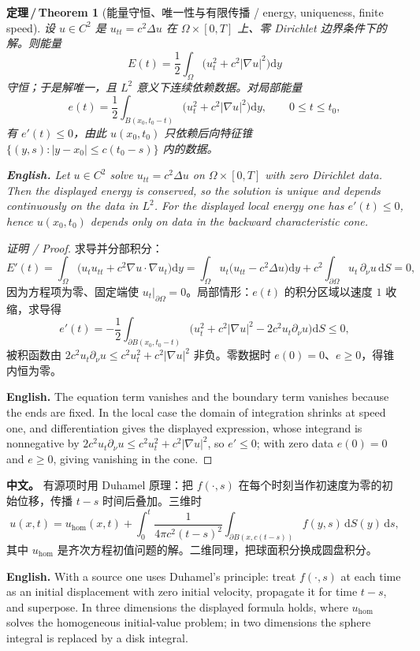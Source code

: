 \documentclass[UTF8,11pt,a4paper]{ctexart}
\newcommand{\APS}[2]{\par\noindent\textbf{中文。} #1\par\noindent\textbf{English.} #2\par\smallskip}
\newcommand{\EN}[1]{\par\noindent \textbf{English.} #1\par}
\newtheorem{theorem}[definition]{定理\,/\,Theorem}
\newcommand{\dd}{\mathrm{d}}
\begin{document}
\begin{theorem}[能量守恒、唯一性与有限传播 / energy, uniqueness, finite speed]\label{thm:waveenergy}
设 $u\in C^2$ 是 $u_{tt}=c^2\Delta u$ 在 $\Omega\times[0,T]$ 上、零 Dirichlet 边界条件下的解。则能量
\[
E(t)=\frac12\int_\Omega\bigl(u_t^2+c^2|\nabla u|^2\bigr)\dd y
\]
守恒；于是解唯一，且 $L^2$ 意义下连续依赖数据。对局部能量
\[
e(t)=\frac12\int_{B(x_0,t_0-t)}\bigl(u_t^2+c^2|\nabla u|^2\bigr)\dd y,\qquad 0\le t\le t_0,
\]
有 $e'(t)\le0$，由此 $u(x_0,t_0)$ 只依赖后向特征锥 $\{(y,s):|y-x_0|\le c(t_0-s)\}$ 内的数据。
\EN{Let $u\in C^2$ solve $u_{tt}=c^2\Delta u$ on $\Omega\times[0,T]$ with zero Dirichlet data. Then the displayed energy is conserved, so the solution is unique and depends continuously on the data in $L^2$. For the displayed local energy one has $e'(t)\le0$, hence $u(x_0,t_0)$ depends only on data in the backward characteristic cone.}
\end{theorem}

\begin{proof}[证明 / Proof]
求导并分部积分：
\[
E'(t)=\int_\Omega\bigl(u_tu_{tt}+c^2\nabla u\cdot\nabla u_t\bigr)\dd y
=\int_\Omega u_t\bigl(u_{tt}-c^2\Delta u\bigr)\dd y+c^2\int_{\partial\Omega}u_t\,\partial_\nu u\,\dd S=0,
\]
因为方程项为零、固定端使 $u_t|_{\partial\Omega}=0$。局部情形：$e(t)$ 的积分区域以速度 $1$ 收缩，求导得
\[
e'(t)=-\frac12\int_{\partial B(x_0,t_0-t)}\bigl(u_t^2+c^2|\nabla u|^2-2c^2u_t\partial_\nu u\bigr)\dd S\le0,
\]
被积函数由 $2c^2u_t\partial_\nu u\le c^2u_t^2+c^2|\nabla u|^2$ 非负。零数据时 $e(0)=0$、$e\ge0$，得锥内恒为零。\EN{The equation term vanishes and the boundary term vanishes because the ends are fixed. In the local case the domain of integration shrinks at speed one, and differentiation gives the displayed expression, whose integrand is nonnegative by $2c^2u_t\partial_\nu u\le c^2u_t^2+c^2|\nabla u|^2$, so $e'\le0$; with zero data $e(0)=0$ and $e\ge0$, giving vanishing in the cone.}
\end{proof}

\APS{有源项时用 Duhamel 原理：把 $f(\cdot,s)$ 在每个时刻当作初速度为零的初始位移，传播 $t-s$ 时间后叠加。三维时
\[
u(x,t)=u_{\text{hom}}(x,t)+\int_0^t\frac{1}{4\pi c^2(t-s)^2}\int_{\partial B(x,c(t-s))}f(y,s)\,\dd S(y)\,\dd s ,
\]
其中 $u_{\text{hom}}$ 是齐次方程初值问题的解。二维同理，把球面积分换成圆盘积分。}{With a source one uses Duhamel's principle: treat $f(\cdot,s)$ at each time as an initial displacement with zero initial velocity, propagate it for time $t-s$, and superpose. In three dimensions the displayed formula holds, where $u_{\text{hom}}$ solves the homogeneous initial-value problem; in two dimensions the sphere integral is replaced by a disk integral.}
\end{document}
